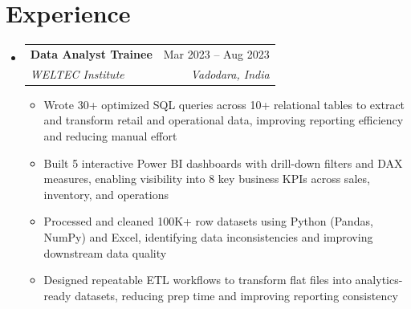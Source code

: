 \documentclass[letterpaper,11pt]{article}
\makeatletter
\newcommand{\resumeItem}[1]{
  \item\small{
    {#1 \vspace{-2pt}}
  }
}
\newcommand{\resumeSubheading}[4]{
  \vspace{-2pt}\item
    \begin{tabular*}{0.97\textwidth}[t]{l@{\extracolsep{\fill}}r}
      \textbf{#1} & #2 \\
      \textit{\small#3} & \textit{\small #4} \\
    \end{tabular*}\vspace{-7pt}
}
\newcommand{\resumeSubHeadingListStart}{\begin{itemize}[leftmargin=0.15in, label={}]}
\newcommand{\resumeSubHeadingListEnd}{\end{itemize}}
\newcommand{\resumeItemListStart}{\begin{itemize}[leftmargin=0.18in, itemsep=1pt, topsep=2pt]}
\newcommand{\resumeItemListEnd}{\end{itemize}\vspace{-5pt}}
\makeatother
\begin{document}
\section{Experience}
  \resumeSubHeadingListStart
    \resumeSubheading
      {Data Analyst Trainee}{Mar 2023 -- Aug 2023}
      {WELTEC Institute}{Vadodara, India}
      \resumeItemListStart
        \resumeItem{Wrote 30+ optimized SQL queries across 10+ relational tables to extract and transform retail and operational data, improving reporting efficiency and reducing manual effort}
        \resumeItem{Built 5 interactive Power BI dashboards with drill-down filters and DAX measures, enabling visibility into 8 key business KPIs across sales, inventory, and operations}
        \resumeItem{Processed and cleaned 100K+ row datasets using Python (Pandas, NumPy) and Excel, identifying data inconsistencies and improving downstream data quality}
        \resumeItem{Designed repeatable ETL workflows to transform flat files into analytics-ready datasets, reducing prep time and improving reporting consistency}
      \resumeItemListEnd
  \resumeSubHeadingListEnd

\end{document}
